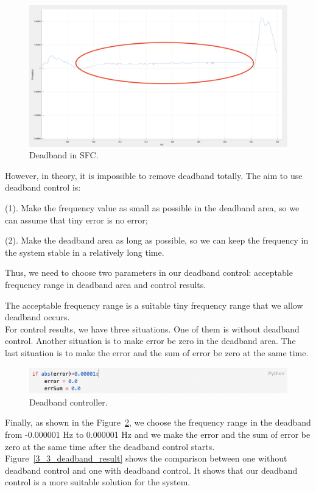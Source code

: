 \begin{figure}[!htbp]
\center
\includegraphics[scale=0.3]{figure/3_3_deadband.png}
\caption{Deadband in SFC.}
\label{3_3_deadband}
\end{figure}


However, in theory, it is impossible to remove deadband totally. The aim to use deadband control is: 
	
    (1). Make the frequency value as small as possible in the deadband area, so we can assume that tiny error is no error;
    
	(2). Make the deadband area as long as possible, so we can keep the frequency in the system stable in a relatively long time. 

Thus, we need to choose two parameters in our deadband control: acceptable frequency range in deadband area and control results. 

The acceptable frequency range is a suitable tiny frequency range that we allow deadband occurs.\\

For control results, we have three situations. One of them is without deadband control. Another situation is to make error be zero in the deadband area. The last situation is to make the error and the sum of error be zero at the same time.

\begin{figure}[htbp]
\center
\includegraphics[scale=0.65]{figure/3_3_deadband_code.png}
\caption{Deadband controller.}
\label{3_3_deadband_code}
\end{figure}

Finally, as shown in the Figure~\ref{3_3_deadband_code}, we choose the frequency range in the deadband from -0.000001 Hz to 0.000001 Hz and we make the error and the sum of error be zero at the same time after the deadband control starts. Figure~\ref{3_3_deadband_result} shows the comparison between one without deadband control and one with deadband control. It shows that our deadband control is a more suitable solution for the system. 

